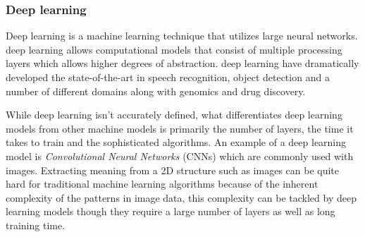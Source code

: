 \documentclass[12pt]{diazessay}
\begin{document}
        

        \subsubsection{Deep learning}
        Deep learning is a machine learning technique that utilizes large neural networks. deep learning allows computational models that consist of multiple processing layers which allows higher degrees of abstraction. deep learning have dramatically developed the state-of-the-art in speech recognition, object detection and a number of different domains along with genomics and drug discovery\cite{Hinton}. %
        
        While deep learning isn't accurately defined, what differentiates deep learning models from other machine models is primarily the number of layers, the time it takes to train and the sophisticated algorithms. An example of a deep learning model is \emph{Convolutional Neural Networks} (CNNs) which are commonly used with images. Extracting meaning from a 2D structure such as images can be quite hard for traditional machine learning algorithms because of the inherent complexity of the patterns in image data, this complexity can be tackled by deep learning models though they require a large number of layers as well as long training time.
        
         
\end{document}
